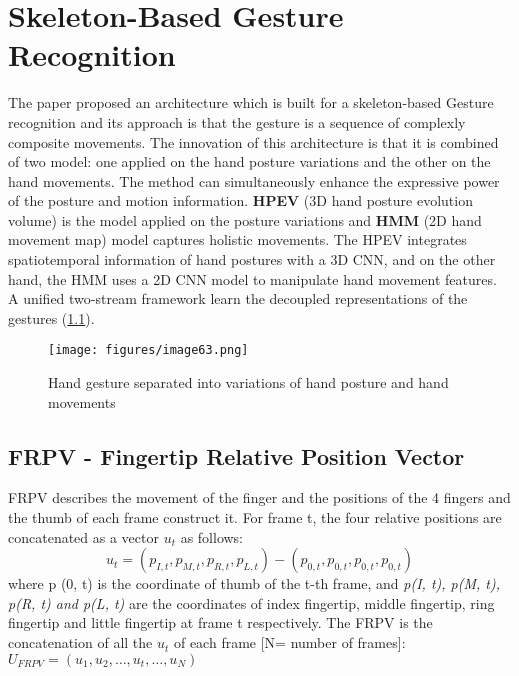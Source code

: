 \documentclass[12pt]{book}
\begin{document}
\chapter{Skeleton-Based Gesture Recognition}
The paper \cite{LIU2020} proposed an architecture which is built for a skeleton-based Gesture recognition and its approach is that the gesture is a sequence of complexly composite movements. The innovation of this architecture is that it is combined of two model: one applied on the hand posture variations and the other on the hand movements. The method can simultaneously enhance the expressive power of the posture and motion information. \textbf{HPEV} (3D hand posture evolution volume) is the model applied on the posture variations and \textbf{HMM} (2D hand movement map) model captures holistic movements. The HPEV integrates spatiotemporal information of hand postures with a 3D CNN, and on the other hand, the HMM uses a 2D CNN model to manipulate hand movement features. A unified two-stream framework learn the decoupled representations of the gestures (\ref{fig:fig33}). 

\begin{figure}[!htbp]
\centering
  \texttt{[image: figures/image63.png]}
  \\
  \caption{Hand gesture separated into variations of hand posture and hand movements \cite{LIU2020}}
  \label{fig:fig33}
\end{figure}

\section{FRPV - Fingertip Relative Position Vector}
FRPV describes the movement of the finger and the positions of the 4 fingers and the thumb of each frame construct it. For frame t, the four relative positions are concatenated as a vector $u_t$ as follows: $$u_t=(p_{I,t},p_{M,t},p_{R,t},p_{L,t})-(p_{0,t},p_{0,t},p_{0,t},p_{0,t})$$
where p (0, t) is the coordinate of thumb of the t-th frame, and \textit{p(I, t), p(M, t), p(R, t) and p(L, t)} are the coordinates of index fingertip, middle fingertip, ring fingertip and little fingertip at frame t respectively. The FRPV is the concatenation of all the $u_t$ of each frame [N= number of frames]: $U_{FRPV}=(u_1,u_2,\dots,u_t,\dots,u_N)$
\end{document}
